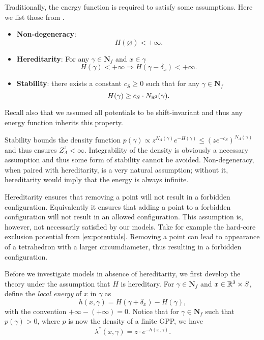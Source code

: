 \noindent Traditionally, the energy function is required to satisfy some assumptions. Here we list those from \cite{Dereudre2017}. 
\begin{itemize}
	\item \textbf{Non-degeneracy}:
		$$H(\varnothing) < +\infty.$$
	\item \textbf{Hereditarity}: For any $\gamma \in \mathbf N_f$ and $x\in \gamma$
		$$H(\gamma)< + \infty \Rightarrow H(\gamma - \delta_x) < +\infty.$$
	\item \textbf{Stability}: there exists a constant $c_S\geq 0$ such that for any $\gamma \in \mathbf N_f$
		$$H(\gamma) \geq c_S\cdot N_{\mathbb R^3} (\gamma).$$
\end{itemize}
Recall also that we assumed all potentials to be shift-invariant and thus any energy function inherits this property.\newline

Stability bounds the density function $p(\gamma) \propto z^{N_\Lambda( \gamma)}e^{-H(\gamma)} \leq (z e^{-c_S})^{N_\Lambda(\gamma)} $ and thus ensures $Z^z_\Lambda < \infty$. Integrability of the density is obviously a necessary assumption and thus some form of stability cannot be avoided. 
Non-degeneracy, when paired with hereditarity, is a very natural assumption; without it, hereditarity would imply that the energy is always infinite.

Hereditarity ensures that removing a point will not result in a forbidden configuration. Equivalently it ensures that adding a point to a forbidden configuration will not result in an allowed configuration. This assumption is, however, not necessarily satisfied by our models. Take for example the hard-core exclusion potential from \ref{ex:potentials}. Removing a point can lead to appearance of a tetrahedron with a larger circumdiameter, thus resulting in a forbidden configuration.\newline

Before we investigate models in absence of hereditarity, we first develop the theory under the assumption that $H$ is hereditary. For $\gamma \in \mathbf N_f$ and $x \in {\mathbb R^3}\times S$, define the \textit{local energy} of $x$ in $\gamma$ as
$$h(x,\gamma) = H(\gamma + \delta_x) - H(\gamma),$$
with the convention $+\infty - (+\infty) = 0$. Notice that for $\gamma \in \mathbf N_f$ such that $p(\gamma) > 0$, where $p$ is now the density of a finite GPP, we have
$$\lambda^*(x,\gamma) = z \cdot e^{-h(x,\gamma)}.$$



